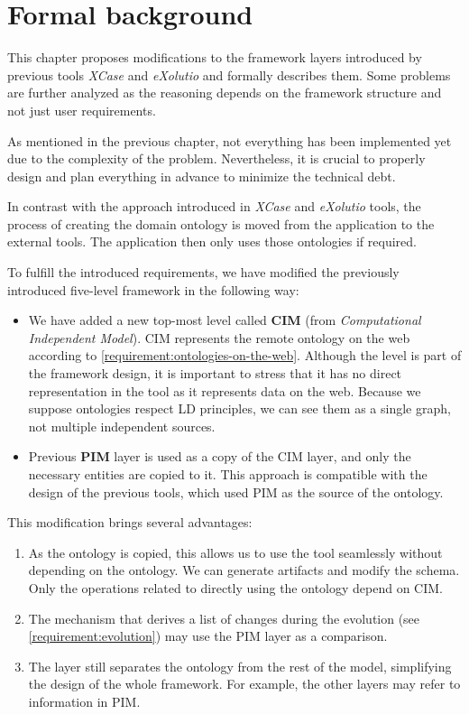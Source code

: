 \chapter{Formal background}
\label{chapters:formal-background}

This chapter proposes modifications to the framework layers introduced by previous tools \textit{XCase} and \textit{eXolutio} and formally describes them. Some problems are further analyzed as the reasoning depends on the framework structure and not just user requirements.

As mentioned in the previous chapter, not everything has been implemented yet due to the complexity of the problem. Nevertheless, it is crucial to properly design and plan everything in advance to minimize the technical debt.

\bigskip

In contrast with the approach introduced in \textit{XCase} and \textit{eXolutio} tools, the process of creating the domain ontology is moved from the application to the external tools. The application then only uses those ontologies if required.

To fulfill the introduced requirements, we have modified the previously introduced five-level framework in the following way:
\begin{itemize}
    \item We have added a new top-most level called \textbf{CIM} (from \textit{Computational Independent Model}). CIM represents the remote ontology on the web according to \autoref{requirement:ontologies-on-the-web}. Although the level is part of the framework design, it is important to stress that it has no direct representation in the tool as it represents data on the web. Because we suppose ontologies respect LD principles, we can see them as a single graph, not multiple independent sources.
    \item Previous \textbf{PIM} layer is used as a copy of the CIM layer, and only the necessary entities are copied to it. This approach is compatible with the design of the previous tools, which used PIM as the source of the ontology.
\end{itemize}

This modification brings several advantages:
\begin{enumerate}
    \item As the ontology is copied, this allows us to use the tool seamlessly without depending on the ontology. We can generate artifacts and modify the schema. Only the operations related to directly using the ontology depend on CIM.
    \item The mechanism that derives a list of changes during the evolution (see \autoref{requirement:evolution}) may use the PIM layer as a comparison.
    \item The layer still separates the ontology from the rest of the model, simplifying the design of the whole framework. For example, the other layers may refer to information in PIM.
\end{enumerate}

